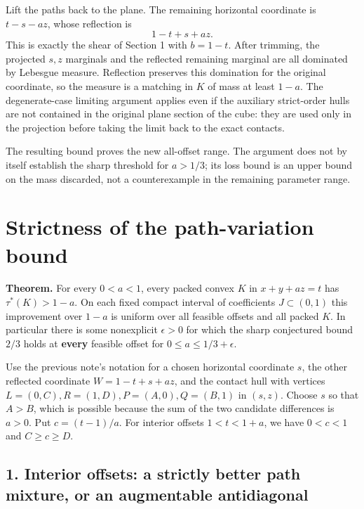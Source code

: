 \documentclass[
  10pt,
]{article}
\begin{document}
Lift the paths back to the plane. The remaining horizontal coordinate is
\(t-s-az\), whose reflection is \[
1-t+s+az .
\] This is exactly the shear of Section 1 with \(b=1-t\). After
trimming, the projected \(s,z\) marginals and the reflected remaining
marginal are all dominated by Lebesgue measure. Reflection preserves
this domination for the original coordinate, so the measure is a
matching in \(K\) of mass at least \(1-a\). The degenerate-case limiting
argument applies even if the auxiliary strict-order hulls are not
contained in the original plane section of the cube: they are used only
in the projection before taking the limit back to the exact contacts.

The resulting bound proves the new all-offset range. The argument does
not by itself establish the sharp threshold for \(a>1/3\); its loss
bound is an upper bound on the mass discarded, not a counterexample in
the remaining parameter range.

\section{Strictness of the path-variation
bound}\label{strictness-of-the-path-variation-bound}



\textbf{Theorem.} For every \(0<a<1\), every packed convex \(K\) in
\(x+y+az=t\) has \(\tau^*(K)>1-a\). On each fixed compact interval of
coefficients \(J\subset(0,1)\) this improvement over \(1-a\) is uniform
over all feasible offsets and all packed \(K\). In particular there is
some nonexplicit \(\epsilon>0\) for which the sharp conjectured bound
\(2/3\) holds at \textbf{every} feasible offset for
\(0\le a\le 1/3+\epsilon\).

Use the previous note's notation for a chosen horizontal coordinate
\(s\), the other reflected coordinate \(W=1-t+s+az\), and the contact
hull with vertices \(L=(0,C), R=(1,D), P=(A,0), Q=(B,1)\) in \((s,z)\).
Choose \(s\) so that \(A>B\), which is possible because the sum of the
two candidate differences is \(a>0\). Put \(c=(t-1)/a\). For interior
offsets \(1<t<1+a\), we have \(0<c<1\) and \(C\ge c\ge D\).

\subsection{1. Interior offsets: a strictly better path mixture, or an
augmentable
antidiagonal}\label{interior-offsets-a-strictly-better-path-mixture-or-an-augmentable-antidiagonal}
\end{document}
